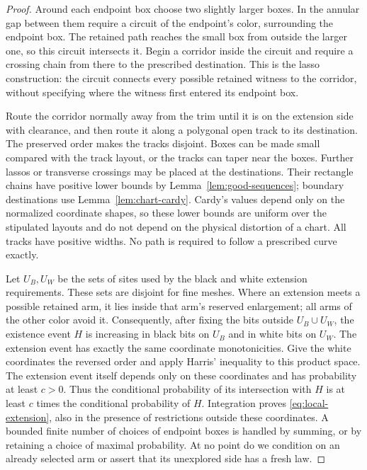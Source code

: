 \begin{proof}
Around each endpoint box choose two slightly larger boxes.  In
the annular gap between them require a circuit of the endpoint's
color, surrounding the endpoint box.  The retained path reaches
the small box from outside the larger one, so this circuit
intersects it.  Begin a corridor inside the circuit and require
a crossing chain from there to the prescribed destination.
This is the lasso construction: the circuit connects every
possible retained witness to the corridor, without specifying
where the witness first entered its endpoint box.

Route the corridor normally away from the trim until it is on
the extension side with clearance, and then route it along a
polygonal open track to its destination.  The preserved order
makes the tracks disjoint.  Boxes can be made small compared
with the track layout, or the tracks can taper near the boxes.
Further lassos or transverse crossings may be placed at the
destinations.  Their rectangle chains have positive lower
bounds by Lemma~\ref{lem:good-sequences}; boundary destinations
use Lemma~\ref{lem:chart-cardy}.  Cardy's values depend only on
the normalized coordinate shapes, so these lower bounds are
uniform over the stipulated layouts and do not depend on the
physical distortion of a chart.  All tracks have positive
widths.  No path is required to follow a prescribed curve
exactly.

Let $U_B,U_W$ be the sets of sites used by the black and white
extension requirements.  These sets are disjoint for fine
meshes.  Where an extension meets a possible retained arm,
it lies inside that arm's reserved enlargement; all arms of
the other color avoid it.  Consequently, after fixing the bits
outside $U_B\cup U_W$, the existence event $H$ is increasing
in black bits on $U_B$ and in white bits on $U_W$.
The extension event has exactly the same coordinate
monotonicities.  Give the white coordinates the reversed
order and apply Harris' inequality to this product space.
The extension event itself depends only on these coordinates
and has probability at least $c>0$.  Thus the conditional
probability of its intersection with $H$ is at least $c$
times the conditional probability of $H$.  Integration proves
\eqref{eq:local-extension}, also in the presence of restrictions
outside these coordinates.  A bounded finite number of choices
of endpoint boxes is handled by summing, or by retaining a
choice of maximal probability.  At no point do we condition on
an already selected arm or assert that its unexplored side has
a fresh law.
\end{proof}

